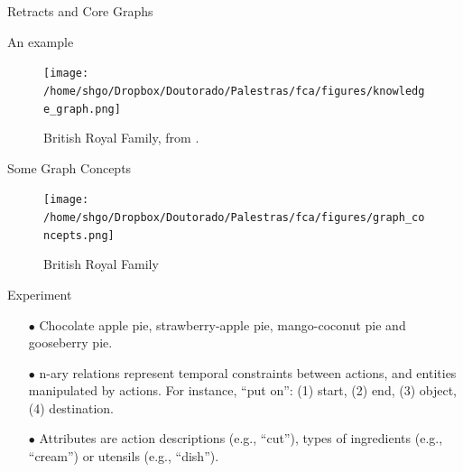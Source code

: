 \documentclass[pdf,xcolor=table]{beamer}
\begin{document}

\begin{frame}[t]{Retracts and Core Graphs}
    \cite{Brewster}
\end{frame}




\begin{frame}[t,label=british]{An example}
    \begin{figure}[h]
        \texttt{[image: /home/shgo/Dropbox/Doutorado/Palestras/fca/figures/knowledge\_graph.png]}
        \caption{British Royal Family, from \cite{Ferre2016}.}
    \end{figure}
\end{frame}

\begin{frame}[c]{Some Graph Concepts}
    \begin{figure}[h]
        \texttt{[image: /home/shgo/Dropbox/Doutorado/Palestras/fca/figures/graph\_concepts.png]}
        \caption{British Royal Family}
    \end{figure}
\end{frame}

\begin{frame}[t]{Experiment}
    \begin{itemize}
        \item[$\bullet$] Chocolate apple pie, strawberry-apple pie, mango-coconut pie and gooseberry pie.
        \item[$\bullet$] n-ary relations represent temporal constraints between actions, and entities manipulated by actions.
        For instance, ``put on'': (1) start, (2) end, (3) object, (4) destination.
        \item[$\bullet$] Attributes are action descriptions (e.g., ``cut''), types of ingredients (e.g., ``cream'') or utensils (e.g., ``dish'').
    \end{itemize}
\end{frame}
\end{document}

